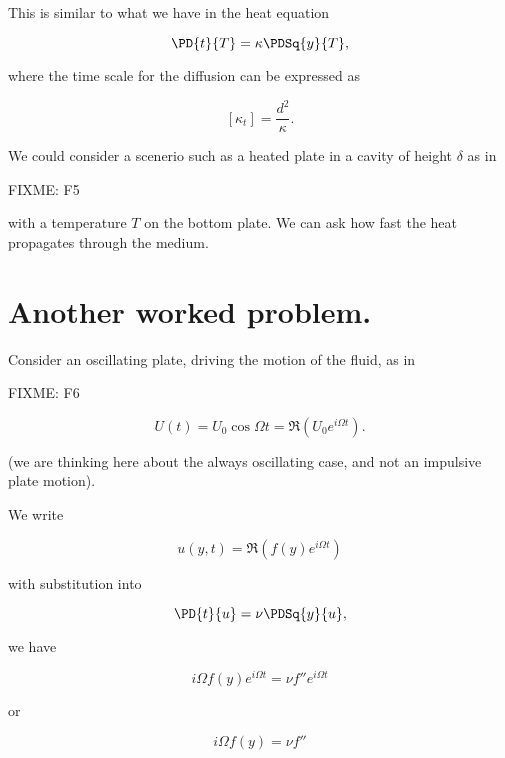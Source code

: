 This is similar to what we have in the heat equation 

\begin{equation}\label{eqn:continuumL17:n}
\PD{t}{T} = \kappa \PDSq{y}{T},
\end{equation}

where the time scale for the diffusion can be expressed as

\begin{equation}\label{eqn:continuumL17:n}
[\kappa_t] = \frac{d^2}{\kappa}.
\end{equation}

We could consider a scenerio such as a heated plate in a cavity of height $\delta$ as in

FIXME: F5

with a temperature $T$ on the bottom plate.  We can ask how fast the heat propagates through the medium.

\section{Another worked problem.}

Consider an oscillating plate, driving the motion of the fluid, as in

FIXME: F6

\begin{equation}\label{eqn:continuumL17:n}
U(t) = U_0 \cos \Omega t = \Re\left( U_0 e^{i \Omega t} \right).
\end{equation}

(we are thinking here about the always oscillating case, and not an impulsive plate motion).

We write

\begin{equation}\label{eqn:continuumL17:n}
u(y, t) = \Re\left( f(y) e^{i \Omega t} \right)
\end{equation}

with substitution into 

\begin{equation}\label{eqn:continuumL17:n}
\PD{t}{u} = \nu \PDSq{y}{u},
\end{equation}

we have

\begin{equation}\label{eqn:continuumL17:n}
i \Omega f(y) e^{i \Omega t} = \nu f'' e^{i \Omega t}
\end{equation}

or

\begin{equation}\label{eqn:continuumL17:n}
i \Omega f(y) = \nu f'' 
\end{equation}

